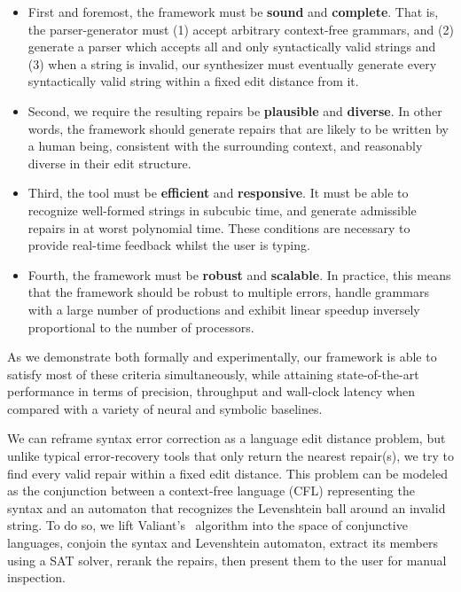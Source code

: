 \documentclass[sigplan,screen]{acmart}
\begin{document}
\begin{itemize}
  \item First and foremost, the framework must be \textbf{sound} and \textbf{complete}. That is, the parser-generator must (1) accept arbitrary context-free grammars, and (2) generate a parser which accepts all and only syntactically valid strings and (3) when a string is invalid, our synthesizer must eventually generate every syntactically valid string within a fixed edit distance from it.
  \item Second, we require the resulting repairs be \textbf{plausible} and \textbf{diverse}. In other words, the framework should generate repairs that are likely to be written by a human being, consistent with the surrounding context, and reasonably diverse in their edit structure.
  \item Third, the tool must be \textbf{efficient} and \textbf{responsive}. It must be able to recognize well-formed strings in subcubic time, and generate admissible repairs in at worst polynomial time. These conditions are necessary to provide real-time feedback whilst the user is typing.
  \item Fourth, the framework must be \textbf{robust} and \textbf{scalable}. In practice, this means that the framework should be robust to multiple errors, handle grammars with a large number of productions and exhibit linear speedup inversely proportional to the number of processors.
\end{itemize}

As we demonstrate both formally and experimentally, our framework is able to satisfy most of these criteria simultaneously, while attaining state-of-the-art performance in terms of precision, throughput and wall-clock latency when compared with a variety of neural and symbolic baselines.

We can reframe syntax error correction as a language edit distance problem, but unlike typical error-recovery tools that only return the nearest repair(s), we try to find every valid repair within a fixed edit distance. This problem can be modeled as the conjunction between a context-free language (CFL) representing the syntax and an automaton that recognizes the Levenshtein ball around an invalid string. To do so, we lift Valiant's~\cite{valiant1975general} algorithm into the space of conjunctive languages, conjoin the syntax and Levenshtein automaton, extract its members using a SAT solver, rerank the repairs, then present them to the user for manual inspection.
\end{document}
